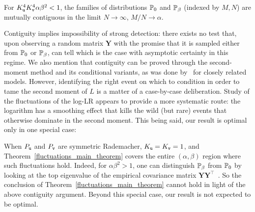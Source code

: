 \documentclass[final,12pt]{colt2018} %
\renewcommand{\intercal}{{\bm \top}}
\newcommand{\utt}{\textup{\texttt{u}}}
\newcommand{\vtt}{\textup{\texttt{v}}}
\newcommand{\Y}{\bm{Y}}
\begin{document}
\begin{corollary}
For $K_{\utt}^4K_{\vtt}^4\alpha\beta^2 <1$, the families of distributions  $\P_{0}$ and $\P_{\beta}$ (indexed by $M,N$) are mutually contiguous in the limit $N \to \infty$, $M/N \to \alpha$.
\end{corollary}
Contiguity implies impossibility of strong detection: there exists no test that, upon observing a random matrix $\Y$ with the promise that it is sampled either from $\P_{0}$ or $\P_{\beta}$, can tell which is the case with asymptotic certainty in this regime. 
We also mention that contiguity can be proved through the second-moment method and its conditional variants, as was done by~\cite{montanari2015limitation,perry2016optimality_annals,banks2017information} for closely related models. However, identifying the right event on which to condition in order to tame the second moment of $L$ is a matter of a case-by-case deliberation. Study of the fluctuations of the log-LR appears to provide a more systematic route: the logarithm has a smoothing effect that kills the wild (but rare) events that otherwise dominate in the second moment. This being said, our result is optimal only in one special case:

When $P_{\utt}$ and $P_{\vtt}$ are symmetric Rademacher, $K_{\utt} = K_{\vtt}=1$, and Theorem~\ref{fluctuations_main_theorem} covers the entire $(\alpha,\beta)$ region where such fluctuations hold. Indeed,  for $\alpha\beta^2>1$, one can distinguish $\P_{\beta}$ from $\P_{0}$ by looking at the top eigenvalue of the empirical covariance matrix $\Y\Y^\intercal$~\citep{benaych2012singular}. So the conclusion of Theorem~\ref{fluctuations_main_theorem} cannot hold in light of the above contiguity argument.  
 Beyond this special case, our result is not expected to be optimal. 
 
\end{document}
